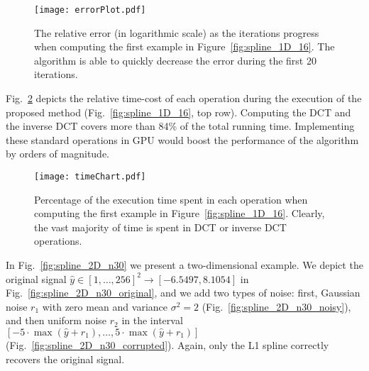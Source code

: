 \documentclass[preprint]{imsart}
\begin{document}
\begin{figure}
    \centering
    \texttt{[image: errorPlot.pdf]}

    \caption{The relative error (in logarithmic scale) as the iterations progress when computing the first example in Figure~\protect\ref{fig:spline_1D_16}. The algorithm is able to quickly decrease the error during the first 20 iterations.}
    \label{fig:errorPlot}
\end{figure}

Fig.~\ref{fig:timeDistribution} depicts the relative time-cost of each operation during the execution of the proposed method (Fig.~\ref{fig:spline_1D_16}, top row). Computing the DCT and the inverse DCT covers more than 84\% of the total running time.
Implementing these standard operations in GPU would boost the performance of the algorithm by orders of magnitude.

\begin{figure}
    \centering
    \texttt{[image: timeChart.pdf]}

    \caption{Percentage of the execution time spent in each operation when computing the first example in Figure~\protect\ref{fig:spline_1D_16}. Clearly, the vast majority of time is spent in DCT or inverse DCT operations.}
    \label{fig:timeDistribution}
\end{figure}

In Fig.~\ref{fig:spline_2D_n30} we present a two-dimensional example. We depict the original signal $\hat{y} \in [1, \dots, 256]^2\rightarrow [-6.5497, 8.1054]$ in Fig.~\ref{fig:spline_2D_n30_original}, and we add two types of noise: first, Gaussian noise $r_1$ with zero mean and variance $\sigma^2=2$ (Fig.~\ref{fig:spline_2D_n30_noisy}), and then uniform noise $r_2$ in the interval $[ -5 \cdot \max (\hat{y} + r_1), \dots, 5 \cdot \max (\hat{y} + r_1) ]$ (Fig.~\ref{fig:spline_2D_n30_corrupted}). Again, only the L1 spline correctly recovers the original signal.
\end{document}
